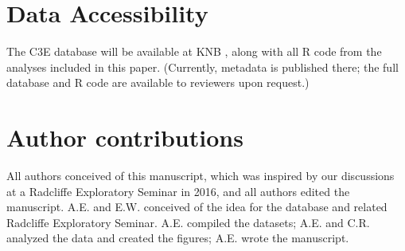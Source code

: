 \documentclass{article}
\begin{document}
\section*{Data Accessibility}
The C3E database will be available at KNB \citep{ettinger2017}, along with all R code from the analyses included in this paper. (Currently, metadata is published there; the full database and R code are available to reviewers upon request.)

\section*{Author contributions} All authors conceived of this manuscript, which was inspired by our discussions at a Radcliffe Exploratory Seminar in 2016, and all authors edited the manuscript. A.E. and E.W. conceived of the idea for the database and related Radcliffe Exploratory Seminar. A.E. compiled the datasets; A.E. and C.R. analyzed the data and created the figures; A.E. wrote the manuscript.
\end{document}
